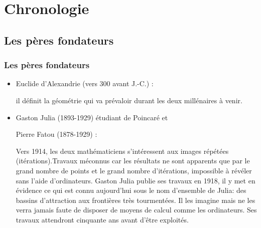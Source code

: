 \documentclass[aspectratio=1610]{beamer}
\begin{document}
\section{Chronologie}

\subsection{Les pères fondateurs}

\begin{frame}
\frametitle{Les pères fondateurs}
\begin{minipage}[t]{0.8\textwidth}
    \begin{flushleft}
\begin{itemize}
    \item Euclide d'Alexandrie (vers 300 avant J.-C.) :
 
        il définit la géométrie qui va prévaloir durant les deux millénaires à venir.
    \item Gaston Julia (1893-1929) étudiant de Poincaré et 

Pierre Fatou (1878-1929) :

        Vers 1914, les deux mathématiciens s'intéressent aux images répétées (itérations).Travaux méconnus car les résultats ne sont apparents que par le grand nombre de points et le grand nombre d'itérations, impossible à révéler sans l'aide d'ordinateurs. Gaston Julia publie ses travaux en 1918, il y met en évidence ce qui est connu aujourd'hui sous le nom d'ensemble de Julia: des bassins d'attraction aux frontières très tourmentées. Il les imagine mais ne les verra jamais faute de disposer de moyens de calcul comme les ordinateurs. Ses travaux attendront cinquante ans avant d'être exploités.


\end{itemize}
\end{flushleft}
\end{minipage}
\end{frame}
\end{document}
